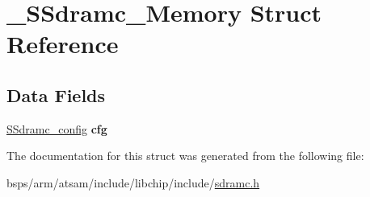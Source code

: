 \hypertarget{struct__SSdramc__Memory}{}\section{\+\_\+\+S\+Sdramc\+\_\+\+Memory Struct Reference}
\label{struct__SSdramc__Memory}
\subsection*{Data Fields}
\begin{DoxyCompactItemize}
\item 
\mbox{\label{struct__SSdramc__Memory_ad09f1ac7e4219184b5498feb32fedc73}} 
\mbox{\hyperlink{struct__SSdramc__config}{S\+Sdramc\+\_\+config}} {\bfseries cfg}
\end{DoxyCompactItemize}


The documentation for this struct was generated from the following file\+:\begin{DoxyCompactItemize}
\item 
bsps/arm/atsam/include/libchip/include/\mbox{\hyperlink{sdramc_8h}{sdramc.\+h}}\end{DoxyCompactItemize}
